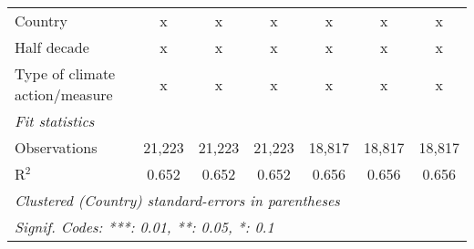 \begin{tabular}{lcccccc}
   Country                                                   & x       & x              & x              & x             & x             & x\\  
   Half decade                                               & x       & x              & x              & x             & x             & x\\  
   Type of climate action/measure                            & x       & x              & x              & x             & x             & x\\  
   \midrule \emph{Fit statistics}\\
   Observations                                              & 21,223  & 21,223         & 21,223         & 18,817        & 18,817        & 18,817\\  
   R$^2$                                                     & 0.652   & 0.652          & 0.652          & 0.656         & 0.656         & 0.656\\  
   \midrule
   \multicolumn{7}{l}{\emph{Clustered (Country) standard-errors in parentheses}}\\
   \multicolumn{7}{l}{\emph{Signif. Codes: ***: 0.01, **: 0.05, *: 0.1}}\\
\end{tabular}
\par\endgroup


